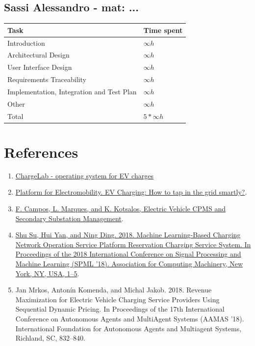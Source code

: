 \documentclass[11pt]{article}
\begin{document}
\subsection{Sassi Alessandro - mat: ...}

\begin{tabular}{|l|l|}
    \hline
    \textbf{Task} & \textbf{Time spent} \\
    \hline
    Introduction & $\infty h$ \\
    \hline
    Architectural Design & $\infty h$ \\
    \hline
    User Interface Design & $\infty h$ \\
    \hline
    Requirements Traceability & $\infty h$ \\
    \hline
    Implementation, Integration and Test Plan & $\infty h$ \\
    \hline
    Other & $\infty h$ \\
    \hline
    \hline
    Total & $5*\infty h$ \\
    \hline
\end{tabular}

\newpage

\section{References}
\label{section:references}

\begin{enumerate}
    \item \href{https://www.chargelab.co/}{ChargeLab - operating system for EV charges}
    \item \href{https://www.platformelectromobility.eu/2022/05/17/ev-charging-how-to-tap-in-the-grid-smartly/}{Platform for Electromobility. EV Charging: How to tap in the grid smartly?}.
    \item \href{https://mobilityintegrationsymposium.org/wp-content/uploads/sites/10/2018/11/4A_3_Emob18_024_paper_Filipe_Campos.pdf}{F. Campos, L. Marques, and K. Kotsalos, Electric Vehicle CPMS and Secondary Substation Management}.
    \item \href{https://doi.org/10.1145/3297067.3297078}{Shu Su, Hui Yan, and Ning Ding. 2018. Machine Learning-Based Charging Network Operation Service Platform Reservation Charging Service System. In Proceedings of the 2018 International Conference on Signal Processing and Machine Learning (SPML '18). Association for Computing Machinery, New York, NY, USA, 1–5}.
    \item Jan Mrkos, Antonín Komenda, and Michal Jakob. 2018. Revenue Maximization for Electric Vehicle Charging Service Providers Using Sequential Dynamic Pricing. In Proceedings of the 17th International Conference on Autonomous Agents and MultiAgent Systems (AAMAS '18). International Foundation for Autonomous Agents and Multiagent Systems, Richland, SC, 832–840.
\end{enumerate}
\end{document}
